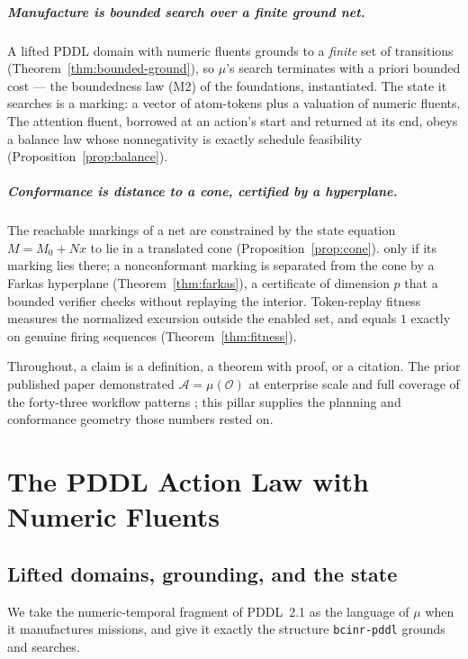 \documentclass[11pt,oneside]{book}
\theoremstyle{definition}
\theoremstyle{plain}
\theoremstyle{remark}
\newcommand{\Obs}{\mathcal{O}}                 %
\newcommand{\Act}{\mathcal{A}}                 %
\newcommand{\muop}{\mu}                        %
\newcommand{\Nmat}{N}                 %
\newcommand{\code}[1]{\texttt{#1}}
\begin{document}
\paragraph{Manufacture is bounded search over a finite ground net.}
A lifted PDDL domain with numeric fluents grounds to a \emph{finite} set of transitions
(Theorem~\ref{thm:bounded-ground}), so $\muop$'s search terminates with a priori bounded cost
--- the boundedness law (M2) of the foundations, instantiated. The state it searches is a
marking: a vector of atom-tokens plus a valuation of numeric fluents. The attention fluent,
borrowed at an action's start and returned at its end, obeys a balance law whose
nonnegativity is exactly schedule feasibility (Proposition~\ref{prop:balance}).

\paragraph{Conformance is distance to a cone, certified by a hyperplane.}
The reachable markings of a net are constrained by the state equation $M=M_0+\Nmat x$ to lie in a translated cone (Proposition~\ref{prop:cone}).%
only if its marking lies there; a nonconformant marking is separated from the cone by a
Farkas hyperplane (Theorem~\ref{thm:farkas}), a certificate of dimension $p$ that a
bounded verifier checks without replaying the interior. Token-replay fitness measures the
normalized excursion outside the enabled set, and equals $1$ exactly on genuine firing
sequences (Theorem~\ref{thm:fitness}).

Throughout, a claim is a definition, a theorem with proof, or a citation. The prior published
paper \cite{chatman2025} demonstrated $\Act=\muop(\Obs)$ at enterprise scale and full coverage
of the forty-three workflow patterns \cite{vdaalst2003patterns}; this pillar supplies the
planning and conformance geometry those numbers rested on.

\chapter{The PDDL Action Law with Numeric Fluents}
\label{ch:pddl}

\section{Lifted domains, grounding, and the state}

We take the numeric-temporal fragment of PDDL~2.1 \cite{foxlong2003} as the language of
$\muop$ when it manufactures missions, and give it exactly the structure \code{bcinr-pddl}
grounds and searches.
\end{document}
